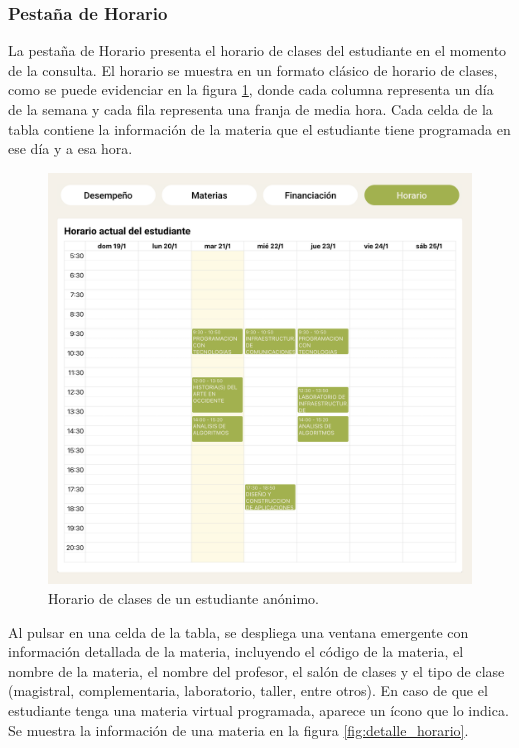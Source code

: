 \subsubsection{Pestaña de Horario}

La pestaña de Horario presenta el horario de clases del estudiante en el momento de la consulta. El horario se muestra en un formato clásico de horario de clases, como se puede evidenciar en la figura \ref{fig:horario}, donde cada columna representa un día de la semana y cada fila representa una franja de media hora. Cada celda de la tabla contiene la información de la materia que el estudiante tiene programada en ese día y a esa hora.

\begin{figure}[H]
	\includegraphics[width=\textwidth]{assets/nes/horario.png}
	\caption{Horario de clases de un estudiante anónimo.}
	\label{fig:horario}
\end{figure}

Al pulsar en una celda de la tabla, se despliega una ventana emergente con información detallada de la materia, incluyendo el código de la materia, el nombre de la materia, el nombre del profesor, el salón de clases y el tipo de clase (magistral, complementaria, laboratorio, taller, entre otros). En caso de que el estudiante tenga una materia virtual programada, aparece un ícono que lo indica. Se muestra la información de una materia en la figura \ref{fig:detalle_horario}.

